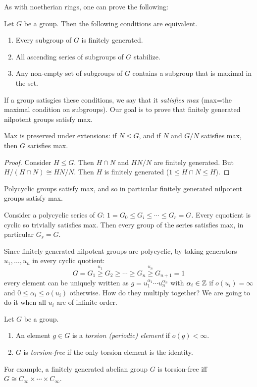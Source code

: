 \documentclass[twoside, 11pt]{article}
\begin{document}
As with noetherian rings, one can prove the following:
\begin{teorema}
Let $G$ be a group. Then the following conditions are equivalent. 
\begin{enumerate}
\item Every subgroup of $G$ is finitely generated. 
\item All ascending series of subgroups of $G$ stabilize.
\item Any non-empty set of subgroups of $G$ contains a subgroup that is maximal in the set. 
\end{enumerate}
\end{teorema}

If a group satisgies these conditions, we say that it \emph{satisfies max} (max=the maximal condition on subgroups). Our goal is to prove that finitely generated nilpotent groups satisfy max. 

\begin{lemma}
Max is preserved under extensions: if $N\trianglelefteq G$, and if $N$ and $G/N$ satisfies max, then $G$ sarisfies max.  
\end{lemma}
\begin{proof}
Consider $H\leq G$. Then $H\cap N$ and $HN/N$ are finitely generated. But $H/(H\cap N)\cong HN/N$. Then $H$ is finitely generated ($1\leq H\cap N\leq H$).
\end{proof}

\begin{teorema}
Polycyclic groups satisfy max, and so in particular finitely generated nilpotent groups satisfy max.
\end{teorema}
\begin{dem}
Consider a polycyclic series of $G$: $1=G_0\leq G_i\leq\cdots\leq G_r=G$. Every cquotient is cyclic so trivially satisfies max. Then every group of the series satisfies max, in particular $G_r=G$. 
\end{dem}

Since finitely generated nilpotent groups are polycyclic, by taking generators $u_1,\dots, u_n$ in every cyclic quotient:
\[
G=G_1\overset{u_1}{\geq} G_2\geq\cdots\geq G_n\overset{u_n}{\geq} G_{n+1}=1
\]
every element can be uniquely written as $g=u_1^{\alpha_1}\cdots u_n^{\alpha_n}$ with $\alpha_i\in \mathbb{Z}$ if $o(u_i)=\infty$ and $0\leq\alpha_i\leq o(u_i)$ otherwise. How do they multiply together? We are going to do it when all $u_i$ are of infinite order. 

\begin{defi}
Let $G$ be a group.
\begin{enumerate}
\item An element $g\in G$ is a \emph{torsion (periodic) element} if $o(g)<\infty$. 
\item $G$ is \emph{torsion-free} if the only torsion element is the identity.
\end{enumerate}

For example, a finitely generated abelian group $G$ is torsion-free iff $G\cong C_\infty\times\cdots\times C_\infty$. 
\end{defi}
\end{document}
